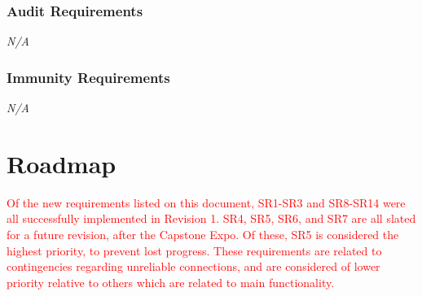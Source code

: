 \documentclass[12pt,letterpaper]{article}
\begin{document}
\subsubsection{Audit Requirements}
\noindent \emph{N/A}

\subsubsection{Immunity Requirements}
\noindent \emph{N/A}

\section{Roadmap}
\textcolor{red}{Of the new requirements listed on this document, SR1-SR3 and SR8-SR14 were all successfully implemented in Revision 1. SR4, SR5, SR6, and SR7 are all slated for a future revision, after the Capstone Expo. Of these, SR5 is considered the highest priority, to prevent lost progress. These requirements are related to contingencies regarding unreliable connections, and are considered of lower priority relative to others which are related to main functionality.}
\end{document}
